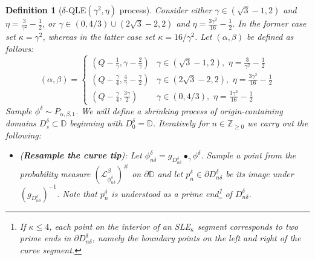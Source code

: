 \documentclass[10pt,a4paper]{amsart}
\newtheorem{definition}{Definition}
\newcommand{\D}{\mathbb{D}}
\newcommand{\cL}{\mathcal{L}}
\begin{document}
\begin{definition}[$\delta$-QLE$(\gamma^2, \eta)$ process] \label{def-delta-QLE-finite}
Consider either $\gamma \in (\sqrt3 -1,2)$ and $\eta = \frac3{\gamma^2} - \frac12$, or $\gamma \in (0, 4/3) \cup (2\sqrt3 - 2,2)$ and $\eta = \frac{3\gamma^2}{16} - \frac12$. In the former case set $\kappa = \gamma^2$, whereas in the latter case set $\kappa = 16/\gamma^2$.
Let $(\alpha,\beta)$ be defined as follows:
\begin{equation*} (\alpha, \beta) = 
        \begin{cases} 
          (Q-\frac{1}{\gamma},\gamma - \frac2\gamma) & \gamma \in (\sqrt3 - 1,2), \, \, \eta = \frac3{\gamma^2} - \frac12 \\
            (Q-\frac{\gamma}{4},\frac4\gamma - \frac\gamma2) & \gamma \in (2\sqrt3 - 2, 2), \, \, \eta = \frac{3\gamma^2}{16} - \frac12 \\
          (Q-\frac{\gamma}{4},\frac{3\gamma}{2}) & \gamma \in (0, 4/3), \, \,  \eta = \frac{3\gamma^2}{16} - \frac12 
       \end{cases}
    \end{equation*}
Sample $\phi^\delta \sim P_{\alpha, \beta, 1}$. We will define a shrinking process of origin-containing domains $D_s^\delta \subset \D$ beginning with $D_0^\delta = \D$. 
Iteratively for $n \in \mathbb Z_{\geq 0}$ we carry out the following:
    \begin{itemize}
        \item (\textbf{Resample the curve tip}): 
        Let $\phi^\delta_{n\delta} = g_{D^\delta_{n\delta}} \bullet_\gamma \phi^\delta$. 
        Sample a point from the probability measure $(\cL_{\phi_{n\delta}^\delta}^{\beta})^\#$ on $\partial \D$ and let $p^\delta_n \in \partial D_{n\delta}^\delta$ be its image under $(g_{D_{n\delta}^\delta})^{-1}$. Note that $p^\delta_n$ is understood as a prime end\footnote{If $\kappa \leq 4$, each point on the interior of an SLE$_\kappa$ segment corresponds to two prime ends in $\partial D^\delta_{n\delta}$, namely the boundary points on the left and right of the curve segment.} of $D_{n\delta}^\delta$. 
        

\end{itemize}
\end{definition}
\end{document}
